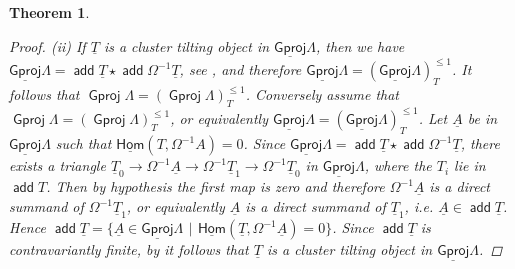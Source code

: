 \documentclass[oneside, a4paper,reqno]{amsart}
\numberwithin{equation}{section}
\newtheorem{thm}{Theorem}[section]
\theoremstyle{definition}
\begin{document}
\begin{thm}
\begin{proof}
(ii) If $\underline{T}$ is a cluster tilting object in ${\operatorname{\underline{\mathsf{Gproj}}}\nolimits}\Lambda$, then we have ${\operatorname{\underline{\mathsf{Gproj}}}\nolimits}\Lambda = \operatorname*{\mathsf{add}} \underline{T} \star \operatorname*{\mathsf{add}} \Omega^{-1}\underline{T}$, see \cite{KR}, and therefore  ${\operatorname{\underline{\mathsf{Gproj}}}\nolimits}\Lambda = ({\operatorname{\underline{\mathsf{Gproj}}}\nolimits}\Lambda)^{\leq 1}_{T}$. It follows that  ${\operatorname{\mathsf{Gproj}}\nolimits}\Lambda = ({\operatorname{\mathsf{Gproj}}\nolimits}\Lambda)^{\leq 1}_{T}$.  Conversely assume that ${\operatorname{\mathsf{Gproj}}\nolimits}\Lambda = ({\operatorname{\mathsf{Gproj}}\nolimits}\Lambda)^{\leq 1}_{T}$, or equivalently ${\operatorname{\underline{\mathsf{Gproj}}}\nolimits}\Lambda = ({\operatorname{\underline{\mathsf{Gproj}}}\nolimits}\Lambda)^{\leq 1}_{T}$. Let ${\underline A}$ be in ${\operatorname{\underline{\mathsf{Gproj}}}\nolimits}\Lambda$ such that $\operatorname*{\underline{\mathsf{Hom}}}(T,\Omega^{-1}A)= 0$.  Since ${\operatorname{\underline{\mathsf{Gproj}}}\nolimits}\Lambda = \operatorname*{\mathsf{add}} \underline{T} \star \operatorname*{\mathsf{add}} \Omega^{-1}\underline{T}$, there exists a triangle $\underline{T}_{0} {\longrightarrow} \Omega^{-1}{\underline A} {\longrightarrow} \Omega^{-1}\underline{T}_{1} {\longrightarrow} \Omega^{-1}\underline{T}_{0}$ in ${\operatorname{\underline{\mathsf{Gproj}}}\nolimits}\Lambda$, where the $T_{i}$ lie in $\operatorname*{\mathsf{add}} T$. Then by hypothesis the first map is zero and therefore $\Omega^{-1}{\underline A}$ is a direct summand of $\Omega^{-1}\underline{T}_{1}$, or equivalently ${\underline A}$ is a direct summand of $\underline{T}_{1}$, i.e. ${\underline A} \in \operatorname*{\mathsf{add}} \underline{T}$. Hence $\operatorname*{\mathsf{add}} \underline{T} = \{{\underline A} \in {\operatorname{\underline{\mathsf{Gproj}}}\nolimits}\Lambda \,\ | \,\ \operatorname*{\underline{\mathsf{Hom}}}(\underline{T},\Omega^{-1}{\underline A}) = 0\}$. Since $\operatorname*{\mathsf{add}}\underline{T}$ is contravariantly finite, by \cite{KZ} it follows that $\underline{T}$ is a cluster tilting object in ${\operatorname{\underline{\mathsf{Gproj}}}\nolimits}\Lambda$.


\end{proof}
\end{thm}
\end{document}
